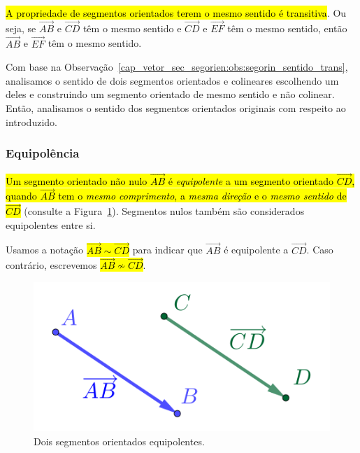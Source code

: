 \begin{obs}\label{cap_vetor_sec_segorien:obs:segorin_sentido_trans}
  \hl{A propriedade de segmentos orientados terem o mesmo sentido é transitiva}. Ou seja, se $\overrightarrow{AB}$ e $\overrightarrow{CD}$ têm o mesmo sentido e $\overrightarrow{CD}$ e $\overrightarrow{EF}$ têm o mesmo sentido, então $\overrightarrow{AB}$ e $\overrightarrow{EF}$ têm o mesmo sentido.
\end{obs}

Com base na Observação~\ref{cap_vetor_sec_segorien:obs:segorin_sentido_trans}, analisamos o sentido de dois segmentos orientados e colineares escolhendo um deles e construindo um segmento orientado de mesmo sentido e não colinear. Então, analisamos o sentido dos segmentos orientados originais com respeito ao introduzido.

\subsubsection{Equipolência}

\hl{Um segmento orientado não nulo $\overrightarrow{AB}$ é \emph{equipolente} a um segmento orientado $\overrightarrow{CD}$, quando $\overrightarrow{AB}$ tem o \emph{mesmo comprimento}, a \emph{mesma direção} e o \emph{mesmo sentido} de $\overrightarrow{CD}$} (consulte a Figura~\ref{cap_vetor_sec_segorien:fig:segequipolentes}). Segmentos nulos também são considerados equipolentes entre si. 

Usamos a notação \hl{$\overrightarrow{AB} \sim \overrightarrow{CD}$} para indicar que $\overrightarrow{AB}$ é equipolente a $\overrightarrow{CD}$. Caso contrário, escrevemos \hl{$\overrightarrow{AB} \not\sim \overrightarrow{CD}$}.

\begin{figure}[h]
  \centering
  \includegraphics{./cap_vetor/dados/fig_segequipolentes/fig.png}
  \caption{Dois segmentos orientados equipolentes.}
  \label{cap_vetor_sec_segorien:fig:segequipolentes}
\end{figure}

